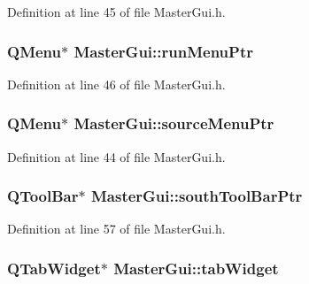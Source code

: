 Definition at line 45 of file Master\-Gui.\-h.

\hypertarget{class_master_gui_ae5b13b338972e99f29e623d258088b07}{
\subsubsection[{run\-Menu\-Ptr}]{\setlength{\rightskip}{0pt plus 5cm}Q\-Menu$\ast$ Master\-Gui\-::run\-Menu\-Ptr\hspace{0.3cm}{\ttfamily [private]}}}\label{class_master_gui_ae5b13b338972e99f29e623d258088b07}


Definition at line 46 of file Master\-Gui.\-h.

\hypertarget{class_master_gui_a3ffd8337f87c7c6eca6b4740fa8d1c57}{
\subsubsection[{source\-Menu\-Ptr}]{\setlength{\rightskip}{0pt plus 5cm}Q\-Menu$\ast$ Master\-Gui\-::source\-Menu\-Ptr\hspace{0.3cm}{\ttfamily [private]}}}\label{class_master_gui_a3ffd8337f87c7c6eca6b4740fa8d1c57}


Definition at line 44 of file Master\-Gui.\-h.

\hypertarget{class_master_gui_a4a0234ba347ba345e79eff8c19ba27c8}{
\subsubsection[{south\-Tool\-Bar\-Ptr}]{\setlength{\rightskip}{0pt plus 5cm}Q\-Tool\-Bar$\ast$ Master\-Gui\-::south\-Tool\-Bar\-Ptr\hspace{0.3cm}{\ttfamily [private]}}}\label{class_master_gui_a4a0234ba347ba345e79eff8c19ba27c8}


Definition at line 57 of file Master\-Gui.\-h.

\hypertarget{class_master_gui_a3bca8bd4cc4ecef70de27afff52a7b08}{
\subsubsection[{tab\-Widget}]{\setlength{\rightskip}{0pt plus 5cm}Q\-Tab\-Widget$\ast$ Master\-Gui\-::tab\-Widget\hspace{0.3cm}{\ttfamily [private]}}}\label{class_master_gui_a3bca8bd4cc4ecef70de27afff52a7b08}


